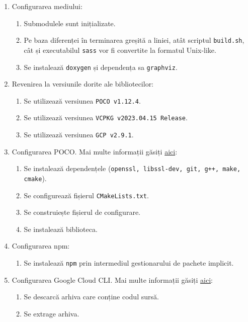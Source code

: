 \begin{enumerate}
  \item Configurarea mediului:
    \begin{enumerate}
      \item Submodulele sunt inițializate.
      \item Pe baza diferenței în terminarea greșită a liniei, atât scriptul \texttt{build.sh}, cât și executabilul \texttt{sass} vor fi convertite la formatul Unix-like.
      \item Se instalează \texttt{doxygen} și dependența sa \texttt{graphviz}.
    \end{enumerate}
  \item Revenirea la versiunile dorite ale bibliotecilor:
    \begin{enumerate}
      \item Se utilizează versiunea \texttt{POCO v1.12.4}.
      \item Se utilizează versiunea \texttt{VCPKG v2023.04.15 Release}.
      \item Se utilizează versiunea \texttt{GCP v2.9.1}.
    \end{enumerate}
  \item Configurarea POCO. Mai multe informații găsiți \href{https://github.com/pocoproject/poco}{aici}:
    \begin{enumerate}
      \item Se instalează dependențele (\texttt{openssl, libssl-dev, git, g++, make, cmake}).
      \item Se configurează fișierul \texttt{CMakeLists.txt}.
      \item Se construiește fișierul de configurare.
      \item Se instalează biblioteca.
    \end{enumerate}
  \item Configurarea npm:
    \begin{enumerate}
      \item Se instalează \texttt{npm} prin intermediul gestionarului de pachete implicit.
    \end{enumerate}
  \item Configurarea Google Cloud CLI. Mai multe informații găsiți \href{https://cloud.google.com/sdk/docs/install}{aici}:
    \begin{enumerate}
      \item Se descarcă arhiva care conține codul sursă.
      \item Se extrage arhiva.
    \end{enumerate}

\end{enumerate}
